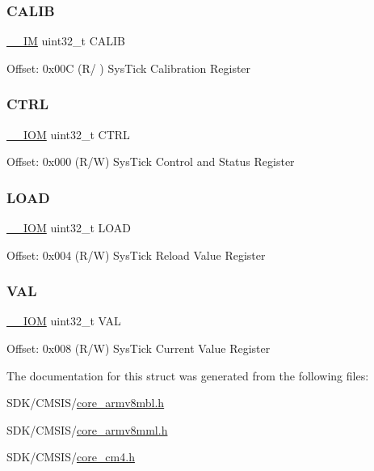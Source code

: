 \subsubsection{\texorpdfstring{C\+A\+L\+IB}{CALIB}}
{\footnotesize\ttfamily \mbox{\hyperlink{core__cm4_8h_a4cc1649793116d7c2d8afce7a4ffce43}{\+\_\+\+\_\+\+IM}} uint32\+\_\+t C\+A\+L\+IB}

Offset\+: 0x00C (R/ ) Sys\+Tick Calibration Register \mbox{\label{struct_sys_tick___type_ac81efc171e9852a36caeb47122bfec5b}} 
\subsubsection{\texorpdfstring{C\+T\+RL}{CTRL}}
{\footnotesize\ttfamily \mbox{\hyperlink{core__cm4_8h_ab6caba5853a60a17e8e04499b52bf691}{\+\_\+\+\_\+\+I\+OM}} uint32\+\_\+t C\+T\+RL}

Offset\+: 0x000 (R/W) Sys\+Tick Control and Status Register \mbox{\label{struct_sys_tick___type_a0c1333686137b7e25a46bd548a5b5bc3}} 
\subsubsection{\texorpdfstring{L\+O\+AD}{LOAD}}
{\footnotesize\ttfamily \mbox{\hyperlink{core__cm4_8h_ab6caba5853a60a17e8e04499b52bf691}{\+\_\+\+\_\+\+I\+OM}} uint32\+\_\+t L\+O\+AD}

Offset\+: 0x004 (R/W) Sys\+Tick Reload Value Register \mbox{\label{struct_sys_tick___type_ae7a655a853654127f3dfb7fa32c3f457}} 
\subsubsection{\texorpdfstring{V\+AL}{VAL}}
{\footnotesize\ttfamily \mbox{\hyperlink{core__cm4_8h_ab6caba5853a60a17e8e04499b52bf691}{\+\_\+\+\_\+\+I\+OM}} uint32\+\_\+t V\+AL}

Offset\+: 0x008 (R/W) Sys\+Tick Current Value Register 

The documentation for this struct was generated from the following files\+:\begin{DoxyCompactItemize}
\item 
S\+D\+K/\+C\+M\+S\+I\+S/\mbox{\hyperlink{core__armv8mbl_8h}{core\+\_\+armv8mbl.\+h}}\item 
S\+D\+K/\+C\+M\+S\+I\+S/\mbox{\hyperlink{core__armv8mml_8h}{core\+\_\+armv8mml.\+h}}\item 
S\+D\+K/\+C\+M\+S\+I\+S/\mbox{\hyperlink{core__cm4_8h}{core\+\_\+cm4.\+h}}\end{DoxyCompactItemize}
